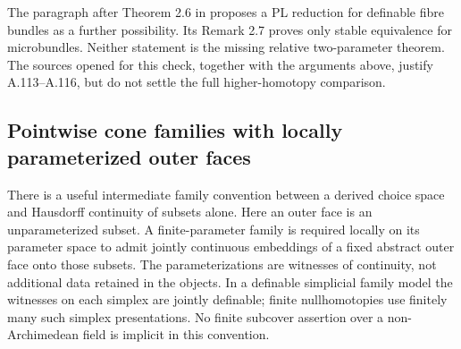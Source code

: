 The paragraph after Theorem 2.6 in
\cite[p.~35]{Shiota2010} proposes a PL reduction for definable
fibre bundles as a further possibility. Its Remark 2.7 proves
only stable equivalence for microbundles. Neither statement is
the missing relative two-parameter theorem. The sources opened
for this check, together with the arguments above, justify
A.113--A.116, but do not
settle the full higher-homotopy comparison.

\subsection{Pointwise cone families with locally parameterized outer faces}

There is a useful intermediate family convention between a derived
choice space and Hausdorff continuity of subsets alone. Here an outer
face is an unparameterized subset. A finite-parameter family is required
locally on its parameter space to admit jointly continuous embeddings
of a fixed abstract outer face onto those subsets. The parameterizations
are witnesses of continuity, not additional data retained in the objects.
In a definable simplicial family model the witnesses on each simplex
are jointly definable; finite nullhomotopies use finitely many such
simplex presentations. No finite subcover assertion over a
non-Archimedean field is implicit in this convention.

